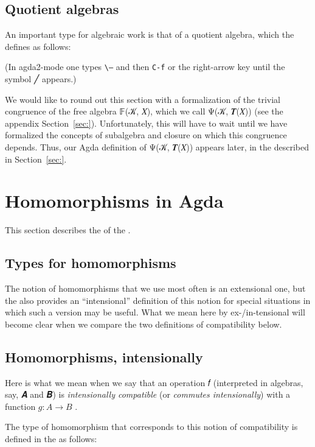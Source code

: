 \documentclass[a4paper,UKenglish,cleveref, autoref, thm-restate]{lipics-v2019}
\begin{document}
\subsection{Quotient algebras}
An important type for algebraic work is that of a quotient algebra, which the \agdaualib defines as follows:
\begin{code}\end{code}

\noindent (In agda2-mode one types \texttt{\textbackslash ---} and then \texttt{C-f} or the right-arrow key until the symbol ╱ appears.)

We would like to round out this section with a formalization of the trivial congruence of the free algebra 𝔽(𝒦, 𝑋), which we call Ψ(𝒦, 𝑻(𝑋)) (see the appendix Section~\ref{sec:}). Unfortunately, this will have to wait until we have formalized the concepts of subalgebra and closure on which this congruence depends. Thus, our Agda definition of Ψ(𝒦, 𝑻(𝑋)) appears later, in the \closuremodule described in Section~\ref{sec:}.

\section{Homomorphisms in Agda}\label{sec:homs-in-agda}
This section describes the \homsmodule of the \agdaualib.

\subsection{Types for homomorphisms}\label{types-for-homomorphisms}
The notion of homomorphisms that we use most often is an extensional one, but the \agdaualib also provides an ``intensional'' definition of this notion for special situations in which such a version may be useful. What we mean here by ex-/in-tensional will become clear when we compare the two definitions of compatibility below.

\subsection{Homomorphisms, intensionally}
Here is what we mean when we say that an operation 𝑓 (interpreted in algebras, say, 𝑨 and 𝑩) is \emph{intensionally compatible} (or \emph{commutes intensionally}) with a function \(g : A → B\) .
\begin{code}\end{code}
The type of homomorphism that corresponds to this notion of compatibility is defined in the \agdaualib as follows:
\begin{code}\end{code}
\end{document}

